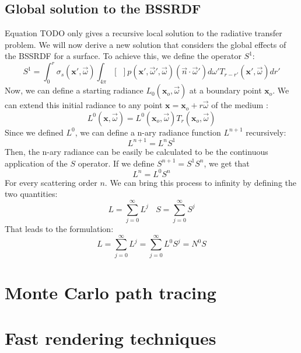 \subsection{Global solution to the BSSRDF}
Equation TODO only gives a recursive local solution to the radiative transfer problem. We will now derive a new solution that considers the global effects of the BSSRDF for a surface.  To achieve this, we define the operator $S^1$:
$$
S^1 = \int_0^r \sigma_s(\mathbf{x}', \vec{\omega}) \int_{4\pi} [\ \ ] p(\mathbf{x}', \vec{\omega}', \vec{\omega})  (\vec{n} \cdot \vec{\omega}')  d\omega' T_{r-r'}(\mathbf{x}', \vec{\omega})  dr'
$$
Now, we can define a starting radiance $L_0(\mathbf{x}_o, \vec{\omega})$ at a boundary point $\mathbf{x}_o$. We can extend this initial radiance to any point $\mathbf{x} = \mathbf{x}_o + r \vec{\omega}$ of the medium :
$$
L^0(\mathbf{x}, \vec{\omega}) = L^0(\mathbf{x}_o, \vec{\omega}) T_r(\mathbf{x}_o, \vec{\omega})
$$
Since we defined $L^0$, we can define a n-ary radiance function $L^{n+1}$ recursively:
$$
L^{n+1} = L^n S^1
$$
Then, the n-ary radiance can be easily be calculated to be the continuous application of the $S$ operator. If we define $S^{n+1} = S^1 S^n$, we get that 
$$
L^n = L^0 S^n
$$
For every scattering order $n$.
We can bring this process to infinity by defining the two quantities:
$$
L = \sum_{j=0}^\infty L^j\ \ \ \ S = \sum_{j=0}^\infty S^j
$$
That leads to the formulation:
$$
L =  \sum_{j=0}^\infty L^j = \sum_{j=0}^\infty L^0 S^j = N^0 S
$$

\section{Monte Carlo path tracing} 
\section{Fast rendering techniques} 
